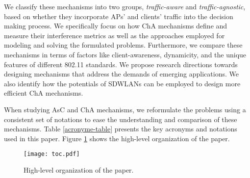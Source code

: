 \begin{itemize}
	We classify these mechanisms into two groups, \textit{traffic-aware} and \textit{traffic-agnostic}, based on whether they incorporate APs' and clients' traffic into the decision making process.
	We specifically focus on how ChA mechanisms define and measure their interference metrics as well as the approaches employed for modeling and solving the formulated problems.
	Furthermore, we compare these mechanisms in terms of factors like client-awareness, dynamicity, and the unique features of different 802.11 standards. %
	We propose research directions towards designing mechanisms that address the demands of emerging applications.
	We also identify how the potentials of SDWLANs can be employed to design more efficient ChA mechanisms.

\end{itemize}
%
%
%
When studying AsC and ChA mechanisms, we reformulate the problems using a consistent set of notations to ease the understanding and comparison of these mechanisms.
Table \ref{acronyme-table} presents the key acronyms and notations used in this paper. 
Figure \ref{fig_paper_org} shows the high-level organization of the paper.


%
\begin{figure}[!t]
	\centering
	\texttt{[image: toc.pdf]}
	\caption{High-level organization of the paper.}
	\label{fig_paper_org}
\end{figure}
%





